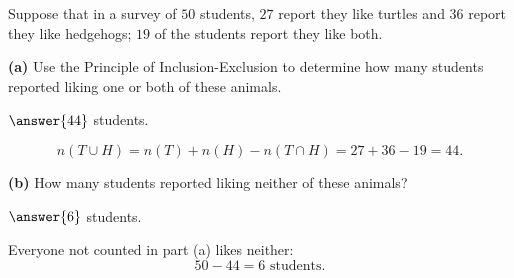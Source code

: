 \documentclass[12pt]{ximera}
\begin{document}
\begin{problem}
Suppose that in a survey of $50$ students, $27$ report they like turtles and $36$
report they like hedgehogs; $19$ of the students report they like both.

\begin{prompt}
\textbf{(a)} Use the Principle of Inclusion-Exclusion to determine how many students
reported liking one or both of these animals.

$\answer{44}$ students.

\begin{solution}
\[
n(T\cup H)=n(T)+n(H)-n(T\cap H)=27+36-19=44.
\]
\end{solution}
\end{prompt}

\begin{prompt}
\textbf{(b)} How many students reported liking neither of these animals?

$\answer{6}$ students.

\begin{solution}
Everyone not counted in part (a) likes neither:
\[ 50-44=6 \text{ students.} \]
\end{solution}
\end{prompt}
\end{problem}
\end{document}
